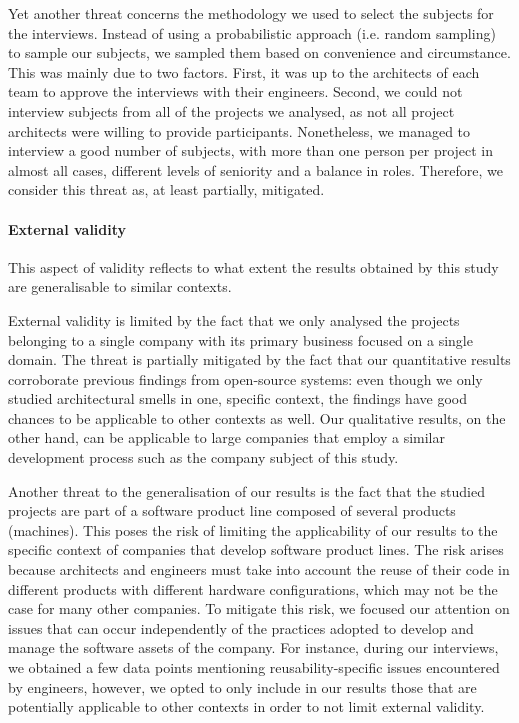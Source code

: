 Yet another threat concerns the methodology we used to select the subjects for the interviews. Instead of using a probabilistic approach (i.e. random sampling) to sample our subjects, we sampled them based on convenience and circumstance. 
This was mainly due to two factors. First, it was up to the architects of each team to approve the interviews with their engineers.
Second, we could not interview subjects from all of the projects we analysed, as not all project architects were willing to provide participants.
Nonetheless, we managed to interview a good number of subjects, with more than one person per project in almost all cases, different levels of seniority and a balance in roles. Therefore, we consider this threat as, at least partially, mitigated.

\paragraph{External validity}
This aspect of validity reflects to what extent the results obtained by this study are generalisable to similar contexts.

External validity is limited by the fact that we only analysed the projects belonging to a single company with its primary business focused on a single domain.
The threat is partially mitigated by the fact that our quantitative results corroborate previous findings from open-source systems: even though we only studied architectural smells in one, specific context, the findings have good chances to be applicable to other contexts as well.
Our qualitative results, on the other hand, can be applicable to large companies that employ a similar development process such as the company subject of this study.

Another threat to the generalisation of our results is the fact that the studied projects are part of a software product line composed of several products (machines).
This poses the risk of limiting the applicability of our results to the specific context of companies that develop software product lines.
The risk arises because architects and engineers must take into account the reuse of their code in different products with different hardware configurations, which may not be the case for many other companies.
To mitigate this risk, we focused our attention on issues that can occur independently of the practices adopted to develop and manage the software assets of the company.
For instance, during our interviews, we obtained a few data points mentioning reusability-specific issues encountered by engineers, however, we opted to only include in our results those that are potentially applicable to other contexts in order to not limit external validity.

